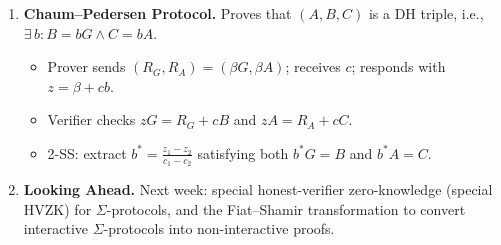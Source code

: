 \documentclass[11pt]{article}
\begin{document}
\begin{tcolorbox}[colback=blue!5!white, colframe=blue!60!black, title={Lecture Summary}]
\begin{enumerate}
  \item \textbf{Chaum--Pedersen Protocol.} Proves that $(A, B, C)$ is a DH triple, i.e., $\exists\, b: B = bG \wedge C = bA$.
    \begin{itemize}
      \item Prover sends $(R_G, R_A) = (\beta G, \beta A)$; receives $c$; responds with $z = \beta + cb$.
      \item Verifier checks $zG = R_G + cB$ and $zA = R_A + cC$.
      \item 2-SS: extract $b^* = \frac{z_1 - z_2}{c_1 - c_2}$ satisfying both $b^*G = B$ and $b^*A = C$.
    \end{itemize}

  \item \textbf{Looking Ahead.} Next week: special honest-verifier zero-knowledge (special HVZK) for $\Sigma$-protocols, and the Fiat--Shamir transformation to convert interactive $\Sigma$-protocols into non-interactive proofs.
\end{enumerate}
\end{tcolorbox}
\end{document}
